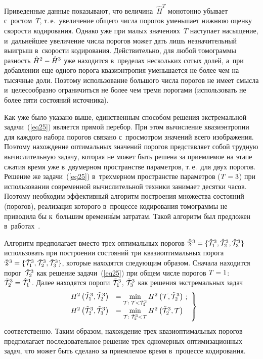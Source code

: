 \begin{multicols}{2}
Приведенные данные показывают, что величина~$\hat{H}^T$ монотонно убывает 
с~ростом~$T$, т.\,е.\ увеличение общего числа порогов уменьшает нижнюю оценку 
скорости кодирования. Однако уже при малых значениях~$T$ наступает насыщение, 
и~дальнейшее увеличение числа порогов может дать лишь незначительный выигрыш в~скорости 
кодирования. Действительно, для любой томограммы разность $\hat{H}^2\hm-\hat{H}^3$ 
уже находится в~пределах нескольких сотых долей, а~при добавлении еще одного порога 
квазиэнтропия уменьшается не более чем на тысячные доли. Поэтому использование 
большого числа порогов не имеет смысла и~целесообразно ограничиться не более чем 
тремя порогами (использовать не более пяти состояний источника).

Как уже было указано выше, единственным способом решения экстремальной 
задачи~(\ref{eq25}) является прямой перебор. При этом вычисление квазиэнтропии 
для каждого набора порогов связано с~просмотром значений всего изображения. 
Поэтому нахождение оптимальных значений порогов представляет собой трудную 
вычислительную задачу, которая не может быть решена за приемлемое на этапе 
сжатия время уже в~двумерном пространстве параметров, т.\,е.\ для двух порогов. 
Решение же задачи~(\ref{eq25}) в~трехмерном пространстве параметров ($T\hm=3$) 
при использовании современной вычислительной техники занимает десятки часов. 
Поэтому необходим эффективный алгоритм построения множества состояний (порогов), 
реализация которого в~процессе кодирования томограммы не приводила бы к~большим 
временн$\acute{\mbox{ы}}$м затратам. Такой алгоритм был предложен в~работах~\cite{b03,b04}.

Алгоритм предполагает вместо трех оптимальных порогов 
 $\hat{\frak T}^3\hm=\{{\hat{\cal T}}^{3}_{1}, {\hat{\cal T}}^{3}_{2}, 
 {\hat{\cal T}}^{3}_{3}\}$ использовать при построении состояний три 
 квазиоптимальных порога $\tilde{\frak T}^3\hm=\{{\tilde{\cal T}}^{3}_{1}, 
 {\tilde{\cal T}}^{3}_{2}, {\tilde{\cal T}}^{3}_{3}\}$, которые находятся 
 следующим образом. Сначала находится порог~${\tilde{\cal T}}^{3}_{2}$ как 
 решение задачи~(\ref{eq25}) при общем числе порогов $T\hm=1$:  
 ${\tilde{\cal T}}^{3}_{2}\hm={\hat{\cal T}}^{1}_{1}$. Далее находятся 
 пороги ${\tilde{\cal T}}^{3}_{1}$, ${\tilde{\cal T}}^{3}_{3}$  
 как решения экстремальных задач
 \begin{equation}
\left.
\begin{array}{rl}
H^{2}\left({\tilde{\cal T}}^{3}_{1},{\tilde{\cal T}}^{3}_{2}\right) &=
\min\limits_{{\cal T}:\;{\cal T} < \tilde{\cal T}^{3}_{2}}  
H^2\left({\cal T},\tilde{\cal T}^{3}_{2}\right)\,;
\\
H^{2}\left({\tilde{\cal T}}^{3}_{2},{\tilde{\cal T}}^{3}_{3}\right) &=
\min\limits_{{\cal T}:\;\tilde{\cal T}^{3}_{2} < 
{\cal T}}  H^2\left(\tilde{\cal T}^{3}_{2},{\cal T}\right)
\end{array}
\right\}
\label{eq26}
\end{equation}
соответственно. Таким образом, нахождение трех квазиоптимальных 
порогов предполагает последовательное решение трех одномерных оптимизационных 
задач, что может быть сделано за приемлемое время в~процессе кодирования.


\end{multicols}
